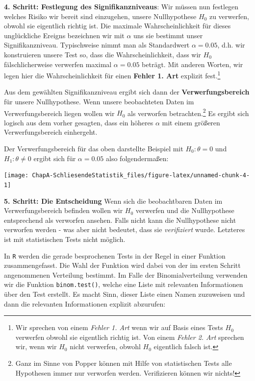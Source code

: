 \documentclass[]{book}
\let\rmarkdownfootnote\footnote%
\def\footnote{\protect\rmarkdownfootnote}
\begin{document}
\textbf{4. Schritt: Festlegung des Signifikanzniveaus}: Wir müssen nun
festlegen welches Risiko wir bereit sind einzugehen, unsere
Nullhypothese \(H_0\) zu verwerfen, obwohl sie eigentlich richtig ist.
Die maximale Wahrscheinlichkeit für dieses unglückliche Ereigns
bezeichnen wir mit \(\alpha\) uns sie bestimmt unser Signifikanzniveau.
Typischweise nimmt man als Standardwert \(\alpha=0.05\), d.h. wir
konstruieren unsere Test so, dass die Wahrscheinlichkeit, dass wir
\(H_0\) fälschlicherweise verwerfen maximal \(\alpha=0.05\) beträgt. Mit
anderen Worten, wir legen hier die Wahrscheinlichkeit für einen
\textbf{Fehler 1. Art} explizit fest.\footnote{Wir sprechen von einem
  \emph{Fehler 1. Art} wenn wir auf Basis eines Tests \(H_0\) verwerfen
  obwohl sie eigentlich richtig ist. Von einem \emph{Fehler 2. Art}
  sprechen wir, wenn wir \(H_0\) nicht verwerfen, obwohl \(H_0\)
  eigentlich falsch ist.}

Aus dem gewählten Signifikanzniveau ergibt sich dann der
\textbf{Verwerfungsbereich} für unsere Nullhypothese. Wenn unsere
beobachteten Daten im Verwerfungsbereich liegen wollen wir \(H_0\) als
verworfen betrachten.\footnote{Ganz im Sinne von Popper können mit Hilfe
  von statistischen Tests alle Hypothesen immer nur verworfen werden.
  Verifizieren können wir nichts!} Es ergibt sich logisch aus dem vorher
gesagten, dass ein höheres \(\alpha\) mit einem größeren
Verwerfungsbereich einhergeht.

Der Verwerfungsbereich für das oben darstellte Beispiel mit
\(H_0: \theta=0\) und \(H_1: \theta\neq 0\) ergibt sich für
\(\alpha=0.05\) also folgendermaßen:

\begin{center}\texttt{[image: ChapA-SchliesendeStatistik\_files/figure-latex/unnamed-chunk-4-1]} \end{center}

\textbf{5. Schritt: Die Entscheidung} Wenn sich die beobachtbaren Daten
im Verwerfungsbereich befinden wollen wir \(H_0\) verwerfen und die
Nullhypothese entsprechend als verworfen ansehen. Falls nicht kann die
Nullhypothese nicht verworfen werden - was aber nicht bedeutet, dass sie
\emph{verifiziert} wurde. Letzteres ist mit statistischen Tests nicht
möglich.

In \texttt{R} werden die gerade besprochenen Tests in der Regel in einer
Funktion zusammengefasst. Die Wahl der Funktion wird dabei von der im
ersten Schritt angenommenen Verteilung bestimmt. Im Falle der
Binomialverteilung verwenden wir die Funktion \texttt{binom.test()},
welche eine Liste mit relevanten Informationen über den Test erstellt.
Es macht Sinn, dieser Liste einen Namen zuzuweisen und dann die
relevanten Informationen explizit abzurufen:
\end{document}
